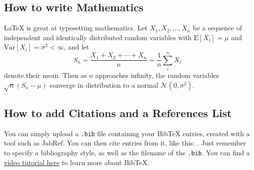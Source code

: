 \documentclass{article}
\begin{document}
\subsection{How to write Mathematics}

\LaTeX{} is great at typesetting mathematics. Let $X_1, X_2, \ldots, X_n$ be a sequence of independent and identically distributed random variables with $\text{E}[X_i] = \mu$ and $\text{Var}[X_i] = \sigma^2 < \infty$, and let
\[S_n = \frac{X_1 + X_2 + \cdots + X_n}{n}
      = \frac{1}{n}\sum_{i}^{n} X_i\]
denote their mean. Then as $n$ approaches infinity, the random variables $\sqrt{n}(S_n - \mu)$ converge in distribution to a normal $\mathcal{N}(0, \sigma^2)$.


\subsection{How to add Citations and a References List}

You can simply upload a \verb|.bib| file containing your BibTeX entries, created with a tool such as JabRef. You can then cite entries from it, like this: \cite{greenwade93}. Just remember to specify a bibliography style, as well as the filename of the \verb|.bib|. You can find a \href{https://www.overleaf.com/help/97-how-to-include-a-bibliography-using-bibtex}{video tutorial here} to learn more about BibTeX.




\end{document}
